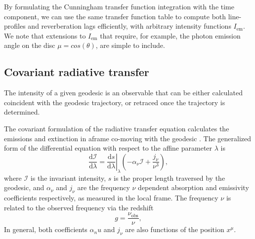 \documentclass[fleqn,usenatbib]{mnras}
\renewcommand{\d}{\text{d}}
\begin{document}
By formulating the Cunningham transfer function integration with the time
component, we can use the same transfer function table to compute both
line-profiles and reverberation lags efficiently, with arbitrary intensity
functions $I_\text{em}$. We note that extensions to $I_\text{em}$ that require,
for example, the photon emission angle on the disc $\mu = cos(\theta)$, are
simple to include.


\subsection{Covariant radiative transfer}

The intensity of a given geodesic is an observable that can be either calculated coincident with the geodesic trajectory, or retraced once the trajectory is determined.

The covariant formulation of the radiative transfer equation calculates the emissions and extinction in aframe co-moving with the geodesic \citep{fuerst_radiation_2004,younsi_general_2012}. The generalized form of the differential equation with respect to the affine parameter $\lambda$ is
\begin{equation}
    \label{eq:covariant-radiative-transfer}
    \frac{\d \mathcal{I}}{\d \lambda} = \left. \frac{\d s}{\d \lambda} \right\rvert_\lambda \left( -\alpha_\nu \mathcal{I} + \frac{j_\nu}{\nu^3} \right),
\end{equation}
where $\mathcal{I}$ is the invariant intensity, $s$ is the proper length traversed by the geodesic, and $\alpha_\nu$ and $j_\nu$ are the frequency $\nu$ dependent absorption and emissivity coefficients respectively, as measured in the local frame. The frequency $\nu$ is related to the observed frequency via the redshift
\begin{equation}
    g = \frac{\nu_\text{obs}}{\nu},
\end{equation}
In general, both coefficients $\alpha_nu$ and $j_\nu$ are also functions of the position $x^\mu$.
\end{document}
